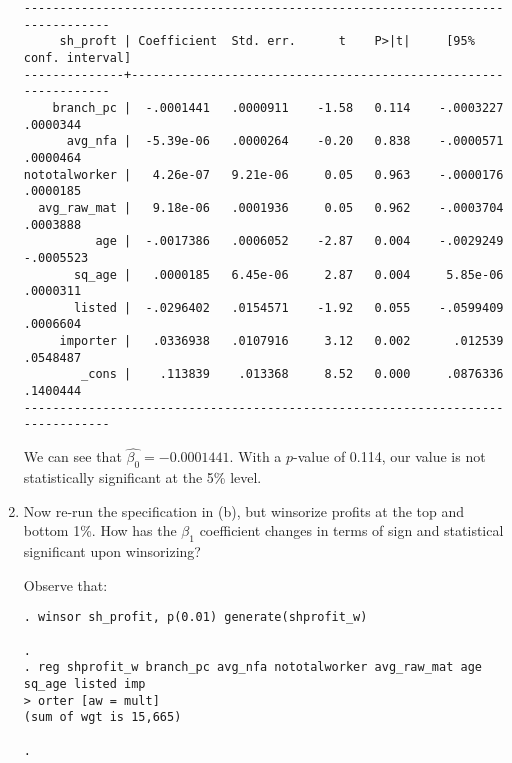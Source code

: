 \documentclass[11pt,twoside,openany]{memoir}
\begin{document}
\begin{question}
\begin{enumerate}[label = (\alph*),itemsep=1pt,topsep=3pt]
{\begin{solution}
\begin{Verbatim}[fontsize=\footnotesize]
-------------------------------------------------------------------------------
     sh_proft | Coefficient  Std. err.      t    P>|t|     [95% conf. interval]
--------------+----------------------------------------------------------------
    branch_pc |  -.0001441   .0000911    -1.58   0.114    -.0003227    .0000344
      avg_nfa |  -5.39e-06   .0000264    -0.20   0.838    -.0000571    .0000464
nototalworker |   4.26e-07   9.21e-06     0.05   0.963    -.0000176    .0000185
  avg_raw_mat |   9.18e-06   .0001936     0.05   0.962    -.0003704    .0003888
          age |  -.0017386   .0006052    -2.87   0.004    -.0029249   -.0005523
       sq_age |   .0000185   6.45e-06     2.87   0.004     5.85e-06    .0000311
       listed |  -.0296402   .0154571    -1.92   0.055    -.0599409    .0006604
     importer |   .0336938   .0107916     3.12   0.002      .012539    .0548487
        _cons |    .113839    .013368     8.52   0.000     .0876336    .1400444
-------------------------------------------------------------------------------
                    \end{Verbatim}
                We can see that $\widehat{\beta_0} = -0.0001441$. With a $p$-value of 0.114, our value is not statistically significant at the 5\% level.
            \end{solution}}
        \item Now re-run the specification in (b), but winsorize profits at the top and bottom 1\%. How has the $\beta_1$ coefficient changes in terms of sign and statistical significant upon winsorizing?
            {\color{blue} \begin{solution}
                Observe that:
                \begin{Verbatim}[fontsize=\footnotesize]
. winsor sh_profit, p(0.01) generate(shprofit_w)

. 
. reg shprofit_w branch_pc avg_nfa nototalworker avg_raw_mat age sq_age listed imp
> orter [aw = mult]
(sum of wgt is 15,665)

.


\end{Verbatim}
\end{solution}}
\end{enumerate}
\end{question}
\end{document}
